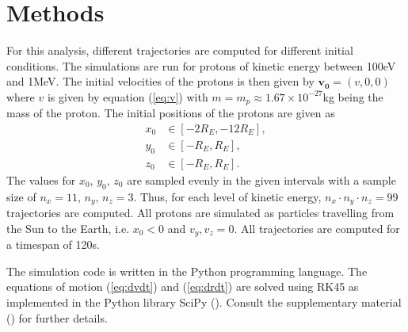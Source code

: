 \section{Methods}
For this analysis, different trajectories are computed for different initial conditions. 
The simulations are run for protons of kinetic energy between 100eV and 1MeV.
The initial velocities of the protons is then given by $\bm{v_0} = (v,0,0)$ where $v$ is given by equation (\ref{eq:v}) with $m=m_p\approx1.67\times 10^{-27}$kg being the mass of the proton.
The initial positions of the protons are given as
\begin{align*}
    x_0 &\in [-2R_E, -12R_E], \\
    y_0 &\in [-R_E, R_E], \\
    z_0 &\in [-R_E,R_E].  
\end{align*}
The values for $x_0,\,y_0,\,z_0$ are sampled evenly in the given intervals with a sample size of $n_x=11$, $n_y,\,n_z = 3$. 
Thus, for each level of kinetic energy, $n_x \cdot n_y \cdot n_z = 99$ trajectories are computed.
All protons are simulated as particles travelling from the Sun to the Earth, i.e. $x_0 < 0$ and $v_y, v_z = 0$.
All trajectories are computed for a timespan of 120s. 

The simulation code is written in the Python programming language. 
The equations of motion (\ref{eq:dvdt}) and (\ref{eq:drdt}) are solved using RK45 as implemented in the Python library SciPy (\cite{scipy_ivp}).
Consult the supplementary material (\cite{supplementary}) for further details.  
